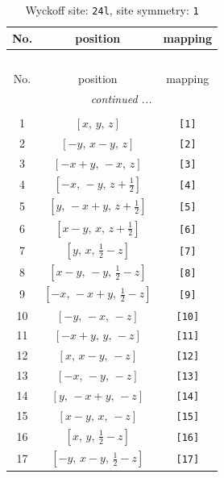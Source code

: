 \documentclass[fleqn,8pt]{jsarticle}
\begin{document}
\begin{longtable}{ccc}
\caption{Wyckoff site: {\tt 24l}, site symmetry: {\tt 1}}
 \\
 \hline \hline
No. & position & mapping \\ \hline \endfirsthead

\multicolumn{2}{l}{\tablename\ \thetable{}} \\
 \hline \hline
No. & position & mapping \\ \hline \endhead

 \hline \hline
\multicolumn{2}{r}{\footnotesize\it continued ...} \\ \endfoot

 \hline \hline
\multicolumn{2}{r}{} \\ \endlastfoot

1 & $\left[ x,\, y,\, z \right]$ & {\tt [1]} \\ \hline
2 & $\left[ - y,\, x - y,\, z \right]$ & {\tt [2]} \\ \hline
3 & $\left[ - x + y,\, - x,\, z \right]$ & {\tt [3]} \\ \hline
4 & $\left[ - x,\, - y,\, z + \frac{1}{2} \right]$ & {\tt [4]} \\ \hline
5 & $\left[ y,\, - x + y,\, z + \frac{1}{2} \right]$ & {\tt [5]} \\ \hline
6 & $\left[ x - y,\, x,\, z + \frac{1}{2} \right]$ & {\tt [6]} \\ \hline
7 & $\left[ y,\, x,\, \frac{1}{2} - z \right]$ & {\tt [7]} \\ \hline
8 & $\left[ x - y,\, - y,\, \frac{1}{2} - z \right]$ & {\tt [8]} \\ \hline
9 & $\left[ - x,\, - x + y,\, \frac{1}{2} - z \right]$ & {\tt [9]} \\ \hline
10 & $\left[ - y,\, - x,\, - z \right]$ & {\tt [10]} \\ \hline
11 & $\left[ - x + y,\, y,\, - z \right]$ & {\tt [11]} \\ \hline
12 & $\left[ x,\, x - y,\, - z \right]$ & {\tt [12]} \\ \hline
13 & $\left[ - x,\, - y,\, - z \right]$ & {\tt [13]} \\ \hline
14 & $\left[ y,\, - x + y,\, - z \right]$ & {\tt [14]} \\ \hline
15 & $\left[ x - y,\, x,\, - z \right]$ & {\tt [15]} \\ \hline
16 & $\left[ x,\, y,\, \frac{1}{2} - z \right]$ & {\tt [16]} \\ \hline
17 & $\left[ - y,\, x - y,\, \frac{1}{2} - z \right]$ & {\tt [17]} \\ \hline

\end{longtable}
\end{document}
